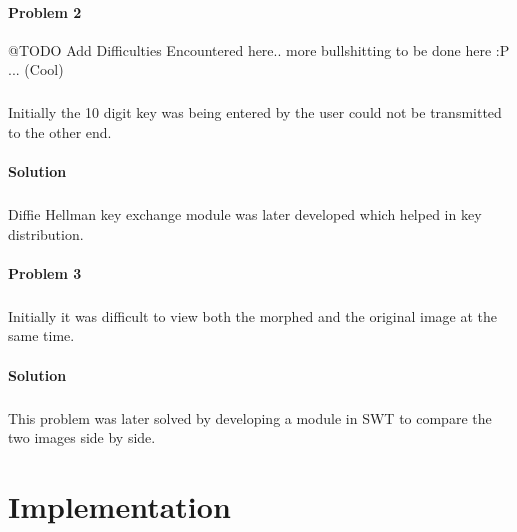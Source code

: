 \documentclass[12pt]{report}
\begin{document}
\subsubsection{Problem 2}
@TODO Add Difficulties Encountered here.. more bullshitting to be done here :P ... (Cool)
\paragraph{}Initially the 10 digit key was being entered by the user could not be transmitted to the other end.
\subsubsection{Solution}
\paragraph{}Diffie Hellman key exchange module was later developed which helped in key distribution.
\subsubsection{Problem 3}
\paragraph{}Initially it was difficult to view both the morphed and the original image at the same time.
\subsubsection{Solution}
\paragraph{}This problem was later solved by developing a module in SWT to compare the two images side by side.
\pagebreak






\pagestyle{fancy}
\chead{}
\rfoot{\small{\thepage}}
\renewcommand{\headrulewidth}{0.4pt}
\renewcommand{\footrulewidth}{0.4pt}

\chapter{Implementation}
\end{document}

